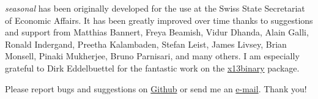 \emph{seasonal} has been originally developed for the use at the Swiss
State Secretariat of Economic Affairs. It has been greatly improved over
time thanks to suggestions and support from Matthias Bannert, Freya
Beamish, Vidur Dhanda, Alain Galli, Ronald Indergand, Preetha
Kalambaden, Stefan Leist, James Livsey, Brian Monsell, Pinaki Mukherjee,
Bruno Parnisari, and many others. I am especially grateful to Dirk
Eddelbuettel for the fantastic work on the
\href{https://cran.r-project.org/package=x13binary}{x13binary} package.

Please report bugs and suggestions on
\href{https://github.com/christophsax/seasonal}{Github} or send me an
\href{mailto:christoph.sax@gmail.com}{e-mail}. Thank you!
